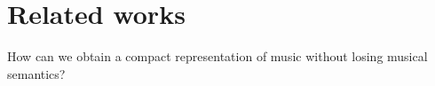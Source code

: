 \chapter{Related works}

How can we obtain a compact representation of music without losing musical semantics?

